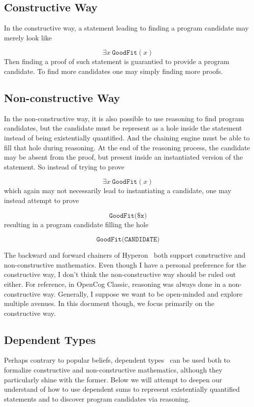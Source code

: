\documentclass[]{report}
\begin{document}
\subsection{Constructive Way}

In the constructive way, a statement leading to finding a program
candidate may merely look like

$$\exists x\ \texttt{GoodFit}(x)$$ Then finding a proof of such
statement is guarantied to provide a program candidate.  To find more
candidates one may simply finding more proofs.

\subsection{Non-constructive Way}

In the non-constructive way, it is also possible to use reasoning to
find program candidates, but the candidate must be represent as a hole
inside the statement instead of being existentially quantified.  And
the chaining engine must be able to fill that hole during reasoning.
At the end of the reasoning process, the candidate may be absent from
the proof, but present inside an instantiated version of the
statement.  So instead of trying to prove

$$\exists x\ \texttt{GoodFit}(x)$$ which again may not necessarily
lead to instantiating a candidate, one may instead attempt to prove

$$\texttt{GoodFit(\$x)}$$ resulting in a program candidate filling the
hole

$$\texttt{GoodFit(CANDIDATE)}$$

The backward and forward chainers of Hyperon~\cite{TODO} both support
constructive and non-constructive mathematics.  Even though I have a
personal preference for the constructive way, I don't think the
non-constructive way should be ruled out either.  For reference, in
OpenCog Classic, reasoning was always done in a non-constructive way.
Generally, I suppose we want to be open-minded and explore multiple
avenues.  In this document though, we focus primarily on the
constructive way.

\subsection{Dependent Types}
Perhaps contrary to popular beliefs, dependent
types~\cite{DependentTypes} can be used both to formalize constructive
and non-constructive mathematics, although they particularly shine
with the former.  Below we will attempt to deepen our understand of
how to use dependent sums to represent existentially quantified
statements and to discover program candidates via reasoning.
\end{document}
